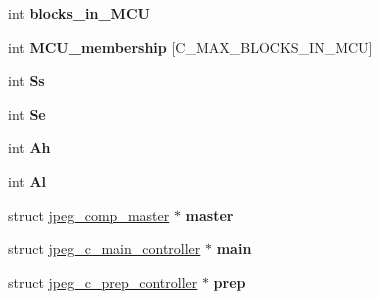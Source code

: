 \begin{DoxyCompactItemize}
\item 
int {\bfseries blocks\+\_\+in\+\_\+\+M\+CU}\hypertarget{structjpeg__compress__struct_ac32cf016a916984f68f158e5310a16bb}{}\label{structjpeg__compress__struct_ac32cf016a916984f68f158e5310a16bb}

\item 
int {\bfseries M\+C\+U\+\_\+membership} \mbox{[}C\+\_\+\+M\+A\+X\+\_\+\+B\+L\+O\+C\+K\+S\+\_\+\+I\+N\+\_\+\+M\+CU\mbox{]}\hypertarget{structjpeg__compress__struct_a6debf977451892aae1116b47c5c1c95f}{}\label{structjpeg__compress__struct_a6debf977451892aae1116b47c5c1c95f}

\item 
int {\bfseries Ss}\hypertarget{structjpeg__compress__struct_adda4b7ef0dda94b38b6e34df42769d81}{}\label{structjpeg__compress__struct_adda4b7ef0dda94b38b6e34df42769d81}

\item 
int {\bfseries Se}\hypertarget{structjpeg__compress__struct_af2c1fe7c62791cda75219c10d71132d9}{}\label{structjpeg__compress__struct_af2c1fe7c62791cda75219c10d71132d9}

\item 
int {\bfseries Ah}\hypertarget{structjpeg__compress__struct_a301a95efc904d22aca78592f7a21673a}{}\label{structjpeg__compress__struct_a301a95efc904d22aca78592f7a21673a}

\item 
int {\bfseries Al}\hypertarget{structjpeg__compress__struct_a4160152697f6042b8fe1d6838a8118e2}{}\label{structjpeg__compress__struct_a4160152697f6042b8fe1d6838a8118e2}

\item 
struct \hyperlink{structjpeg__comp__master}{jpeg\+\_\+comp\+\_\+master} $\ast$ {\bfseries master}\hypertarget{structjpeg__compress__struct_a50b9c60f47c9fff393d7d5b3a7b3618e}{}\label{structjpeg__compress__struct_a50b9c60f47c9fff393d7d5b3a7b3618e}

\item 
struct \hyperlink{structjpeg__c__main__controller}{jpeg\+\_\+c\+\_\+main\+\_\+controller} $\ast$ {\bfseries main}\hypertarget{structjpeg__compress__struct_ab1bb86e9c2ade498b09a9a19d60e6570}{}\label{structjpeg__compress__struct_ab1bb86e9c2ade498b09a9a19d60e6570}

\item 
struct \hyperlink{structjpeg__c__prep__controller}{jpeg\+\_\+c\+\_\+prep\+\_\+controller} $\ast$ {\bfseries prep}\hypertarget{structjpeg__compress__struct_a66875fd858cd11fb7a696a717c5c7b76}{}\label{structjpeg__compress__struct_a66875fd858cd11fb7a696a717c5c7b76}


\end{DoxyCompactItemize}
